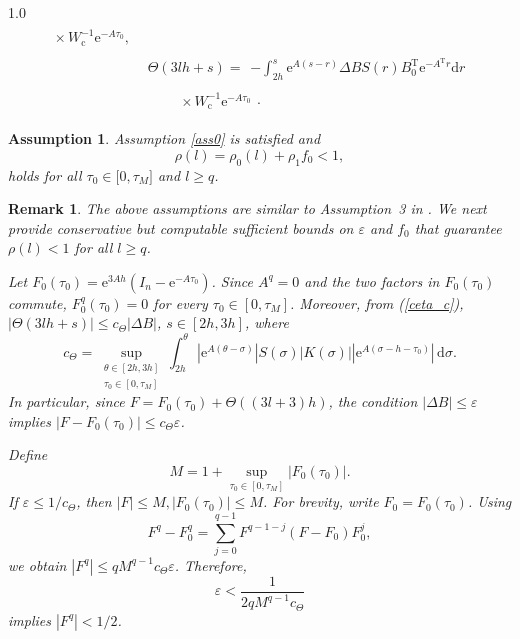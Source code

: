 \documentclass[journal]{IEEEtran}
\newtheorem{assumption}{Assumption}
\newtheorem{remark}{Remark}
\begin{document}
\begin{spacing}{1.0}
\begin{align}
\begin{array}{ll}
	\times \,W_{\mathrm{c}}^{-1}\mathrm{e}^{-A\tau_{0}},
\end{array}\label{delta}\\
&\mathit{\Theta}(3lh+s)=
\begin{array}{ll}
	-\int_{2h}^{s}\mathrm{e}^{A(s-r)}
	\mathit{\Delta}B S(r)B_{0}^{\mathrm{T}}\mathrm{e}^{-A^{\mathrm{T}}r}
	\mathrm{d}r
\end{array}\nonumber\\
&\qquad\begin{array}{ll}
	\times \,W_{\mathrm{c}}^{-1}\mathrm{e}^{-A\tau_{0}}
\end{array}.\label{ceta_c}
\end{align}


\begin{assumption}
\label{ass2}Assumption \ref{ass0} is satisfied and
\[
\rho(l)=\rho_{0}(l)+\rho_{1}f_{0}<1,
\] holds for all $\tau_{0}\in\lbrack0,\tau_{M}]$ and $l\geq q$.
\end{assumption}

\begin{remark}
\label{remark_1}
The above assumptions are similar to Assumption~3 in
\cite{Mazenc25tac}. We next provide conservative but computable sufficient
bounds on $\varepsilon$ and $f_{0}$ that guarantee
$\rho(l)<1$ for all $l\geq q$.

Let
$F_{0}(\tau_{0})=
\mathrm{e}^{3Ah}
\left(
I_{n}-\mathrm{e}^{-A\tau_{0}}
\right)$.
Since $A^{q}=0$ and the two factors in $F_{0}(\tau_{0})$ commute,
$F_{0}^{q}(\tau_{0})=0$ for every
$\tau_{0}\in[0,\tau_{M}]$. Moreover, from (\ref{ceta_c}),
$
\left|
\mathit{\Theta}(3lh+s)
\right|
\leq
c_{\mathit{\Theta}}
\left|
\mathit{\Delta}B
\right|$, $
s\in[2h,3h]$,
where
\[
c_{\mathit{\Theta}}
=
\sup_{\substack{
\theta\in[2h,3h]\\
\tau_{0}\in[0,\tau_{M}]
}}
\int_{2h}^{\theta}
\left|
\mathrm{e}^{A(\theta-\sigma)}
\right|
S(\sigma)
|K(\sigma)|
\left|
\mathrm{e}^{A(\sigma-h-\tau_{0})}
\right|
\,\mathrm{d}\sigma.
\]
In particular, since $F
=
F_{0}(\tau_{0})
+
\mathit{\Theta}((3l+3)h)$,
the condition
$|\mathit{\Delta}B|\leq\varepsilon$ implies
$
\left|
F-F_{0}(\tau_{0})
\right|
\leq
c_{\mathit{\Theta}}\varepsilon$.

Define
\[
M
=
1+
\sup_{\tau_{0}\in[0,\tau_{M}]}
\left|
F_{0}(\tau_{0})
\right|.
\]
If
$\varepsilon\leq1/c_{\mathit{\Theta}}$,
then
$|F|\leq M,
|F_{0}(\tau_{0})|\leq M$.
For brevity, write $F_{0}=F_{0}(\tau_{0})$. Using
\[
F^{q}-F_{0}^{q}
=
\sum_{j=0}^{q-1}
F^{q-1-j}
(F-F_{0})
F_{0}^{j},
\]
we obtain $
|F^{q}|
\leq
qM^{q-1}
c_{\mathit{\Theta}}
\varepsilon$.
Therefore,
\[
\varepsilon
<
\frac{1}{
2qM^{q-1}c_{\mathit{\Theta}}
}
\]
implies $|F^{q}|<1/2$.


\end{remark}
\end{spacing}
\end{document}
